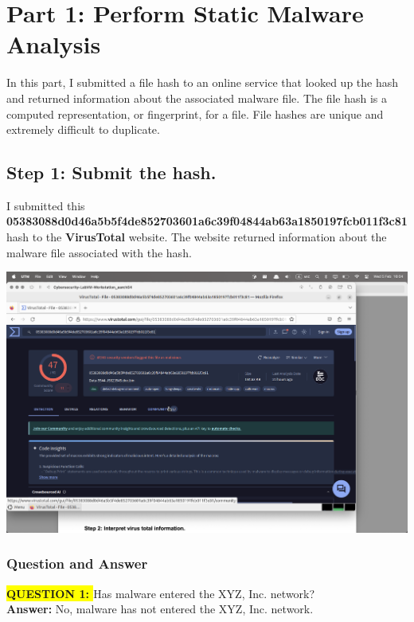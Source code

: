 \documentclass{article}
\begin{document}
\section*{Part 1: Perform Static Malware Analysis}

In this part, I submitted a file hash to an online service that looked up the hash and returned information about the associated malware file. The file hash is a computed representation, or fingerprint, for a file. File hashes are unique and extremely difficult to duplicate.

\subsection*{Step 1: Submit the hash.}

\raggedright{I submitted this \textbf{05383088d0d46a5b5f4de852703601a6c39f04844ab63a1850197fcb011f3c81} hash to the \textbf{VirusTotal} website. The website returned information about the malware file associated with the hash.}

\vspace{2\baselineskip}

\includegraphics[width=1\textwidth]{1.png}

\subsubsection*{Question and Answer}
\textbf{\colorbox{yellow}{QUESTION 1: }}Has malware entered the XYZ, Inc. network? \\
\textbf{Answer: } No, malware has not entered the XYZ, Inc. network.

\vspace{1\baselineskip}
\end{document}
